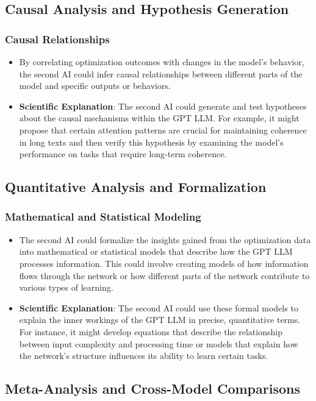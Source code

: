 \documentclass{article}
\begin{document}
\subsection{Causal Analysis and Hypothesis Generation}
\subsubsection{Causal Relationships}
\begin{itemize}
    \item By correlating optimization outcomes with changes in the model’s behavior, the second AI could infer causal relationships between different parts of the model and specific outputs or behaviors.
    \item \textbf{Scientific Explanation}: The second AI could generate and test hypotheses about the causal mechanisms within the GPT LLM. For example, it might propose that certain attention patterns are crucial for maintaining coherence in long texts and then verify this hypothesis by examining the model’s performance on tasks that require long-term coherence.
\end{itemize}

\subsection{Quantitative Analysis and Formalization}
\subsubsection{Mathematical and Statistical Modeling}
\begin{itemize}
    \item The second AI could formalize the insights gained from the optimization data into mathematical or statistical models that describe how the GPT LLM processes information. This could involve creating models of how information flows through the network or how different parts of the network contribute to various types of learning.
    \item \textbf{Scientific Explanation}: The second AI could use these formal models to explain the inner workings of the GPT LLM in precise, quantitative terms. For instance, it might develop equations that describe the relationship between input complexity and processing time or models that explain how the network’s structure influences its ability to learn certain tasks.
\end{itemize}

\subsection{Meta-Analysis and Cross-Model Comparisons}
\end{document}
